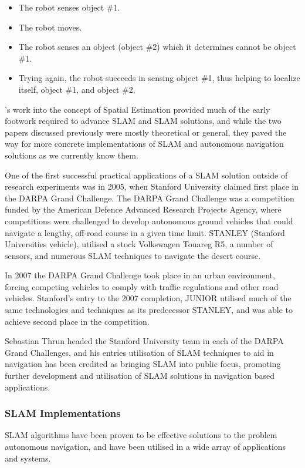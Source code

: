 \begin{itemize}
    \item The robot senses object \#1.
    \item The robot moves. 
    \item The robot senses an object (object \#2) which it determines cannot be
    object \#1.
    \item Trying again, the robot succeeds in sensing object \#1, thus helping
    to localize itself, object \#1, and object \#2.
\end{itemize}

\citeauthor*{Smith1988}'s work into the concept of Spatial Estimation
provided much of the early footwork required to advance SLAM and SLAM
solutions, and while the two papers discussed previously were mostly
theoretical or general, they paved the way for more concrete implementations
of SLAM and autonomous navigation solutions as we currently know them.

One of the first successful practical applications of a SLAM solution outside of
research experiments was in 2005, when Stanford University claimed first
place in the DARPA Grand Challenge.
The DARPA Grand Challenge was a competition funded by the American Defence
Advanced Research Projects Agency, where competitions were challenged to
develop autonomous ground vehicles that could navigate a lengthy, off-road
course in a given time limit. 
STANLEY (Stanford Universities vehicle), utilised a stock Volkswagen
Touareg R5, a number of sensors, and numerous SLAM techniques to navigate the
desert course.

In 2007 the DARPA Grand Challenge took place in an urban environment, forcing
competing vehicles to comply with traffic regulations and other road vehicles.
Stanford's entry to the 2007 completion, JUNIOR utilised much of the same
technologies and techniques as its predecessor STANLEY, and was able to achieve
second place in the competition.

Sebastian Thrun headed the Stanford University team in each of the DARPA Grand
Challenges, and his entries utilisation of SLAM techniques to aid in
navigation has been credited as bringing SLAM into public focus, promoting
further development and utilisation of SLAM solutions in navigation based
applications. 


\subsubsection{SLAM Implementations}
SLAM algorithms have been proven to be effective solutions to the problem
autonomous navigation, and have been utilised in a wide array of applications
and systems.

